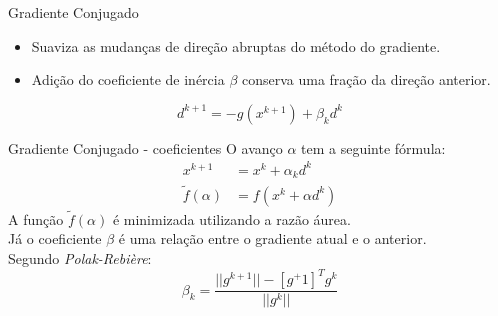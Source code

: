 \begin{frame}{Gradiente Conjugado}
	\vspace{-22mm}
	\begin{itemize}
		\item Suaviza as mudanças de direção abruptas do método do gradiente.
		\vspace{5mm}
		\item Adição do coeficiente de inércia $\beta$ conserva uma fração da direção anterior.
	\end{itemize}
	\vspace{5mm}
	\begin{equation}
	d^{k+1} = -g(x^{k+1}) + \beta_k d^k
	\end{equation}

\end{frame}

\begin{frame}{Gradiente Conjugado - coeficientes}
	O avanço $\alpha$ tem a seguinte fórmula:
		\begin{align}
			x^{k+1} &= x^k + \alpha_k d^k \\
			\tilde{f}(\alpha) &= f(x^k + \alpha d^k)
		\end{align}
		A função $\tilde{f}(\alpha)$ é minimizada utilizando a razão áurea.\\
		Já o coeficiente $\beta$ é uma relação entre o gradiente atual e o anterior.\\
		Segundo \textit{Polak-Rebière}:
		\begin{equation}
			\beta_k = \frac{||g^{k+1}|| - [g^+1]^T g^k}{||g^k||}
		\end{equation}

\end{frame}